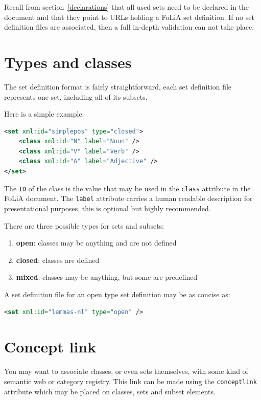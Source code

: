 \documentclass[a4paper,12pt]{report}
\begin{document}
Recall from section~\ref{declarations} that all used sets need to be declared in the document and that they point to URLs holding a FoLiA set definition. If no set definition files are associated, then a full in-depth validation can not take place.

\section{Types and classes}

The set definition format is fairly straightforward, each set definition file represents one set, including all of its subsets.

Here is a simple example:

\begin{lstlisting}[language=xml]
<set xml:id="simplepos" type="closed">
    <class xml:id="N" label="Noun" />
    <class xml:id="V" label="Verb" />
    <class xml:id="A" label="Adjective" />
</set>
\end{lstlisting}

The \texttt{ID} of the class is the value that may be used in the \texttt{class} attribute in the FoLiA document. The \texttt{label} attribute carries a human readable description for presentational purposes, this is optional but highly recommended.

There are three possible types for sets and subsets: 

\begin{enumerate}
\item \textbf{open}: classes may be anything and are not defined
\item \textbf{closed}: classes are defined
\item \textbf{mixed}: classes may be anything, but some are predefined
\end{enumerate}

A set definition file for an open type set definition may be as concise as:

\begin{lstlisting}[language=xml]
<set xml:id="lemmas-nl" type="open" />
\end{lstlisting}

\section{Concept link}

You may want to associate classes, or even sets themselves, with some kind of semantic web or category registry. This link can be made using the \texttt{conceptlink} attribute which may be placed on classes, sets and subset elements. 
\end{document}
